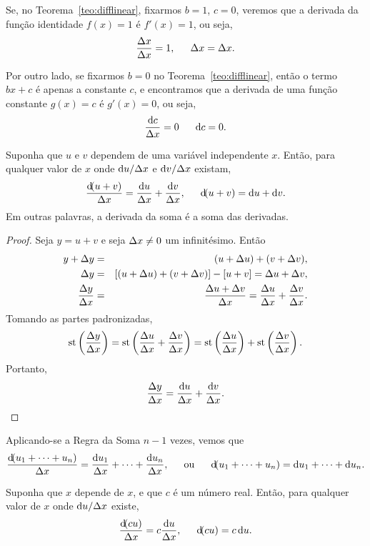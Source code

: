 Se, no Teorema~\ref{teo:difflinear}, fixarmos $b = 1$, $c = 0$, veremos que
a derivada da função identidade $f(x) = 1$ é $f'(x) = 1$, ou seja,
$$
  \frac{\Delta{x}}{\Delta{x}} = 1, \hspace{1.5em} \Delta{x} = \Delta{x}.
$$

Por outro lado, se fixarmos $b = 0$ no Teorema~\ref{teo:difflinear}, então
o termo $b x + c$ é apenas a constante $c$, e encontramos que a derivada
de uma função constante $g(x) = c$ é $g'(x) = 0$, ou seja,
$$
  \frac{\dif c}{\dx} = 0 \hspace{1.5em} \dif c = 0.
$$

\begin{theorem}\label{teo:diffsum}
Suponha que $u$ e $v$ dependem de uma variável independente $x$. Então,
para qualquer valor de $x$ onde $\du/\dx$ e $\dv/\dx$ existam,
$$
  \frac{\dif(u+v)}{\dx} = \frac{\du}{\dx} + \frac{\dv}{\dx},
  \hspace{1.5em}
  \dif(u+v) = \du + \dv.
$$
Em outras palavras, a derivada da soma é a soma das derivadas.
\end{theorem}

\begin{proof} Seja $y = u + v$ e seja $\Delta x \ne 0$ um infinitésimo. Então
\begin{eqnarray*}
  y + \Delta y & = & (u + \Delta u) + (v + \Delta v), \\
  \Delta y & = & [(u + \Delta u) + (v + \Delta v)] - [u + v] = \Delta u + \Delta v, \\
  \frac{\Delta y}{\Delta x} & = & \frac{\Delta u + \Delta v}{\Delta x} = \frac{\Delta u}{\Delta x} + \frac{\Delta v}{\Delta x}.
\end{eqnarray*}
Tomando as partes padronizadas,
$$
  \operatorname{st}\left(\frac{\Delta y}{\Delta x}\right) = \operatorname{st}\left(\frac{\Delta u}{\Delta x} + \frac{\Delta v}{\Delta x}\right) =
    \operatorname{st}\left(\frac{\Delta u}{\Delta x}\right) + \operatorname{st}\left(\frac{\Delta v}{\Delta x}\right).
$$
Portanto, $$\frac{\dy}{\dx} = \frac{\du}{\dx} + \frac{\dv}{\dx}.$$
\end{proof}

Aplicando-se a Regra da Soma $n-1$ vezes, vemos que
$$
  \frac{\dif(u_1 + \cdots + u_n)}{\dx} =
  \frac{\dif u_1}{\dx} + \cdots + \frac{\dif u_n}{\dx},
  \hspace{1.5em} \text{ou} \hspace{1.5em}
  \dif(u_1 + \cdots + u_n) = \dif u_1 + \cdots + \dif u_n.
$$

\begin{theorem}
Suponha que $x$ depende de $x$, e que $c$ é um número real. Então, para
qualquer valor de $x$ onde $\du/\dx$ existe,
$$
  \frac{\dif(cu)}{\dx} = c\frac{\du}{\dx},
  \hspace{1.5em}
  \dif(cu) = c \du.
$$
\end{theorem}

